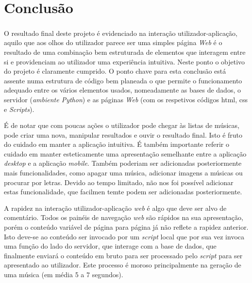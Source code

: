 \documentclass[11pt,openany,twoside]{report}
\begin{document}
\chapter{Conclusão}
\paragraph{ } O resultado final deste projeto é evidenciado na interação utilizador-aplicação, aquilo que aos olhos do utilizador parece ser uma simples página \textit{Web} é o resultado de uma combinação bem estruturada de elementos que interagem entre si e providenciam ao utilizador uma experiência intuitiva. Neste ponto o objetivo do projeto é claramente cumprido. O ponto chave para esta conclusão está assente numa estrutura de código bem planeada o que permite o funcionamento adequado entre os vários elementos usados, nomeadamente as bases de dados, o servidor (\textit{ambiente Python}) e as páginas \textit{Web} (com os respetivos códigos \acs{html}, \acs{css} e \textit{Scripts}).

É de notar que com poucas ações o utilizador pode chegar às listas de músicas, pode criar uma nova, manipular resultados e ouvir o resultado final. Isto é fruto do cuidado em manter a aplicação intuitiva. É também importante referir o cuidado em manter esteticamente uma apresentação semelhante entre a aplicação \textit{desktop} e a aplicação \textit{mobile}. Também poderiam ser adicionadas posteriormente mais funcionalidades, como apagar uma música, adicionar imagens a músicas ou procurar por letras. Devido ao tempo limitado, não nos foi possível adicionar estas funcionalidade, que facilmen temte podem ser adicionadas posteriormente.

A rapidez na interação utilizador-aplicação \textit{web} é algo que deve ser alvo de comentário. Todos os painéis de navegação \textit{web} são rápidos na sua apresentação, porém o conteúdo variável de página para página já não reflete a rapidez anterior. Isto deve-se ao conteúdo ser invocado por um \textit{script} local que por sua vez invoca uma função do lado do servidor, que interage com a base de dados, que finalmente enviará o conteúdo em bruto para ser processado pelo \textit{script} para ser apresentado ao utilizador. Este processo é moroso principalmente na geração de uma música (em média 5 a 7 segundos).
\end{document}
